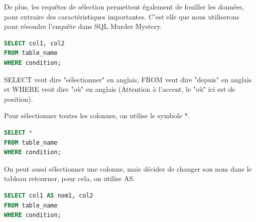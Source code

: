 De plus, les requêtes de sélection permettent également de fouiller les données, pour extraire des caractéristiques importantes.
C'est elle que nous utiliserons pour résoudre l'enquête dans SQL Murder Mystery.

\begin{lstlisting}[style=SQLstyle, language=SQL]
SELECT col1, col2
FROM table_name
WHERE condition;
\end{lstlisting}

SELECT veut dire "sélectionner" en anglais, FROM veut dire "depuis" en anglais et WHERE veut dire "où" en anglais (Attention à l'accent, le "où" ici est de position).

Pour sélectionner toutes les colonnes, on utilise le symbole *.
\begin{lstlisting}[style=SQLstyle, language=SQL]
SELECT * 
FROM table_name
WHERE condition;
\end{lstlisting}

On peut aussi sélectionner une colonne, mais décider de changer son nom dans le tableau retourner, pour cela, on utilise AS.
\begin{lstlisting}[style=SQLstyle, language=SQL]
SELECT col1 AS nom1, col2
FROM table_name
WHERE condition;
\end{lstlisting}


